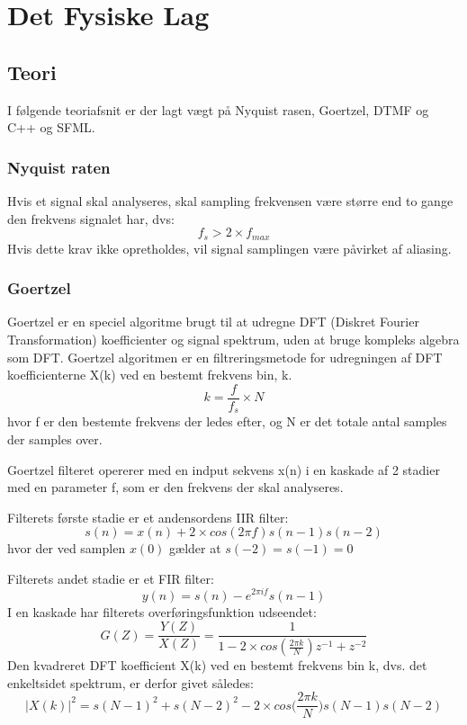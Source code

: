 \section{Det Fysiske Lag}
\subsection{Teori}
I følgende teoriafsnit er der lagt vægt på Nyquist rasen, Goertzel, DTMF og C++ og SFML.

\subsubsection{Nyquist raten}
Hvis et signal skal analyseres, skal sampling frekvensen være større end to gange den frekvens signalet har, dvs:
$$f_s > 2 \times f_{max}$$
Hvis dette krav ikke opretholdes, vil signal samplingen være påvirket af aliasing.

\subsubsection{Goertzel}
Goertzel er en speciel algoritme brugt til at udregne DFT (Diskret Fourier Transformation) koefficienter og signal spektrum, uden at bruge kompleks algebra som DFT.
\newline
Goertzel algoritmen er en filtreringsmetode for udregningen af DFT koefficienterne X(k) ved en bestemt frekvens bin, k.
$$k = \frac{f}{f_s} \times N$$
hvor f er den bestemte frekvens der ledes efter, og N er det totale antal samples der samples over.
\hfill \break

Goertzel filteret opererer med en indput sekvens x(n) i en kaskade af 2 stadier med en parameter f, som er den frekvens der skal analyseres.
\hfill \break

Filterets første stadie er et andensordens IIR filter:
$$s(n) = x(n) + 2 \times cos(2 \pi f)s(n-1)s(n-2)$$
hvor der ved samplen $x(0)$ gælder at $s(-2) = s(-1) = 0$
\hfill \break

Filterets andet stadie er et FIR filter:
$$y(n) = s(n) - e^{2 \pi if} s(n-1)$$
\newline
I en kaskade har filterets overføringsfunktion udseendet:
$$G(Z) = \frac{Y(Z)}{X(Z)} = \frac{1}{1-2 \times cos(\frac{2 \pi k}{N})z^{-1}+z^{-2}}$$
\newline
Den kvadreret DFT koefficient X(k) ved en bestemt frekvens bin k, dvs. det enkeltsidet spektrum, er derfor givet således:
$$|X(k)|^2 = s(N - 1)^2 + s(N-2)^2 - 2 \times cos \bigg(\frac{2 \pi k}{N} \bigg) s(N-1) s(N-2)$$

